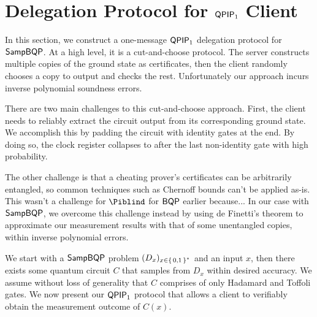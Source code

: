 \section{Delegation Protocol for $\operatorname{\mathsf{QPIP}}_1$ Client}

In this section, we construct a one-message $\operatorname{\mathsf{QPIP}}_1$ delegation protocol for $\operatorname{\mathsf{SampBQP}}$.
At a high level, it is a cut-and-choose protocol.
The server constructs multiple copies of the ground state as certificates,
then the client randomly chooses a copy to output and checks the rest.
Unfortunately our approach incurs inverse polynomial soundness errors.

There are two main challenges to this cut-and-choose approach.
First, the client needs to reliably extract the circuit output from its corresponding ground state.
We accomplish this by padding the circuit with identity gates at the end.
By doing so, the clock register collapses to after the last non-identity gate with high probability.

The other challenge is that a cheating prover's certificates can be arbitrarily entangled,
so common techniques such as Chernoff bounds can't be applied as-is.
This wasn't a challenge for $\Piblind$ for $\operatorname{\mathsf{BQP}}$ earlier because...
In our case with $\operatorname{\mathsf{SampBQP}}$, we overcome this challenge instead by using de Finetti's theorem
to approximate our measurement results with that of some unentangled copies,
within inverse polynomial errors.



We start with a $\operatorname{\mathsf{SampBQP}}$ problem $(D_x)_{x\in\set{0, 1}^*}$ and an input $x$,
then there exists some quantum circuit $C$ that samples from $D_x$ within desired accuracy.
We assume without loss of generality that $C$ comprises of only Hadamard and Toffoli gates.
We now present our $\operatorname{\mathsf{QPIP}}_1$ protocol that allows a client to verifiably obtain the measurement outcome of $C(x)$.


